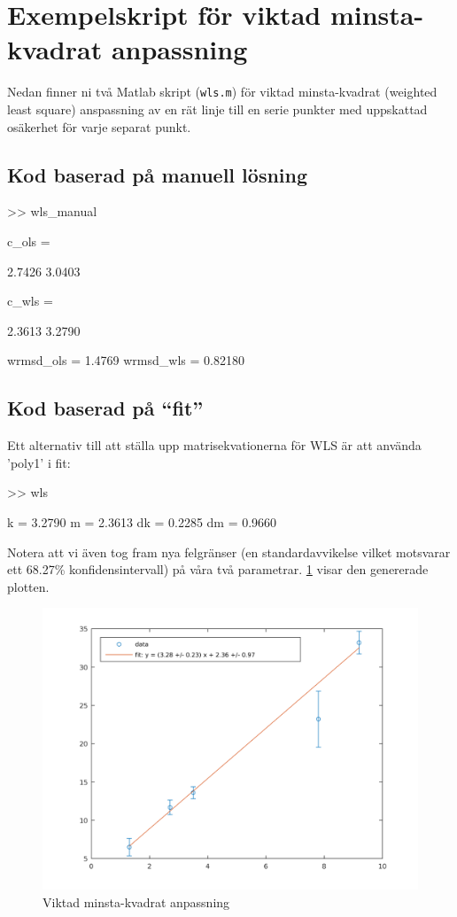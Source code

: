 \section{Exempelskript för viktad minsta-kvadrat anpassning}
\label{sec:matlab-wls}
Nedan finner ni två Matlab skript ({\tt wls.m}) för viktad minsta-kvadrat 
(weighted least square) anspassning av en rät linje till en serie punkter med
uppskattad osäkerhet för varje separat punkt.

\subsection{Kod baserad på manuell lösning}


\begin{terminaloutput}
>> wls_manual

c_ols =

   2.7426
   3.0403

c_wls =

   2.3613
   3.2790

wrmsd_ols =  1.4769
wrmsd_wls =  0.82180

\end{terminaloutput}


\subsection{Kod baserad på ``fit''}
Ett alternativ till att ställa upp matrisekvationerna för WLS
är att använda 'poly1' i fit:


\begin{terminaloutput}
>> wls

k = 3.2790
m =  2.3613
dk = 0.2285
dm = 0.9660
\end{terminaloutput}

Notera att vi även tog fram nya felgränser (en standardavvikelse vilket
motsvarar ett 68.27\% konfidensintervall) på våra två
parametrar. \cref{fig:matlab-wls} visar den genererade plotten.

\begin{figure}
  \centering
  \includegraphics[scale=0.5]{matlab/wls_fit.png}
  \caption{Viktad minsta-kvadrat anpassning}
  \label{fig:matlab-wls}
\end{figure}

